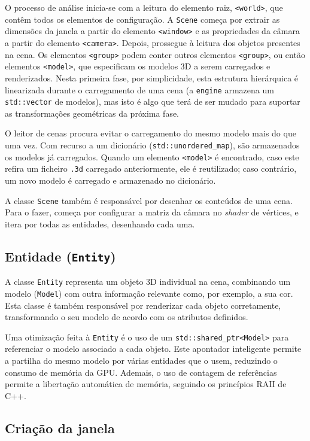 \documentclass[12pt, a4paper]{article}
\begin{document}
O processo de análise inicia-se com a leitura do elemento raiz, \texttt{<world>}, que contêm todos
os elementos de configuração. A \texttt{Scene} começa por extrair as dimensões da janela a partir do
elemento \texttt{<window>} e as propriedades da câmara a partir do elemento \texttt{<camera>}.
Depois, prossegue à leitura dos objetos presentes na cena. Os elementos \texttt{<group>} podem
conter outros elementos \texttt{<group>}, ou então elementos \texttt{<model>}, que especificam os
modelos 3D a serem carregados e renderizados. Nesta primeira fase, por simplicidade, esta estrutura
hierárquica é linearizada durante o carregamento de uma cena (a \texttt{engine} armazena um
\texttt{std::vector} de modelos), mas isto é algo que terá de ser mudado para suportar as
transformações geométricas da próxima fase.

O leitor de cenas procura evitar o carregamento do mesmo modelo mais do que uma vez. Com recurso a
um dicionário (\texttt{std::unordered\_map}), são armazenados os modelos já carregados. Quando um
elemento \texttt{<model>} é encontrado, caso este refira um ficheiro \texttt{.3d} carregado
anteriormente, ele é reutilizado; caso contrário, um novo modelo é carregado e armazenado no
dicionário.

A classe \texttt{Scene} também é responsável por desenhar os conteúdos de uma cena. Para o fazer,
começa por configurar a matriz da câmara no \emph{shader} de vértices, e itera por todas as
entidades, desenhando cada uma.

\subsection{Entidade (\texttt{Entity})}

A classe \texttt{Entity} representa um objeto 3D individual na cena, combinando um modelo
(\texttt{Model}) com outra informação relevante como, por exemplo, a sua cor. Esta classe é também
responsável por renderizar cada objeto corretamente, transformando o seu modelo de acordo com os
atributos definidos.

Uma otimização feita à \texttt{Entity} é o uso de um \texttt{std::shared\_ptr<Model>} para
referenciar o modelo associado a cada objeto. Este apontador inteligente permite a partilha do mesmo
modelo por várias entidades que o usem, reduzindo o consumo de memória da GPU. Ademais, o uso de
contagem de referências permite a libertação automática de memória, seguindo os princípios RAII de
C++.

\subsection{Criação da janela}
\end{document}
